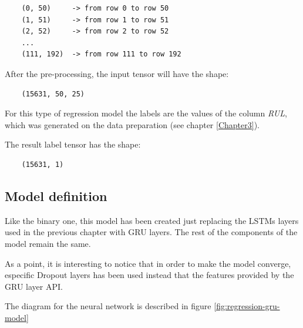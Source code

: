 \begin{verbatim}
    (0, 50)     -> from row 0 to row 50
    (1, 51)     -> from row 1 to row 51
    (2, 52)     -> from row 2 to row 52
    ...
    (111, 192)  -> from row 111 to row 192
\end{verbatim}

After the pre-processing, the input tensor will have the shape:

\begin{verbatim}
    (15631, 50, 25)
\end{verbatim}

For this type of regression model the labels are the values of the column \textit{RUL}, which was generated on the data preparation (see chapter \ref{Chapter3}).

The result label tensor has the shape:

\begin{verbatim}
    (15631, 1)
\end{verbatim}


\subsection{Model definition}

Like the binary one, this model has been created just replacing the LSTMs layers used in the previous chapter with GRU layers. The rest of the components of the model remain the same.

As a point, it is interesting to notice that in order to make the model converge, especific Dropout layers has been used instead that the features provided by the GRU layer API.

The diagram for the neural network is described in figure \ref{fig:regression-gru-model}


